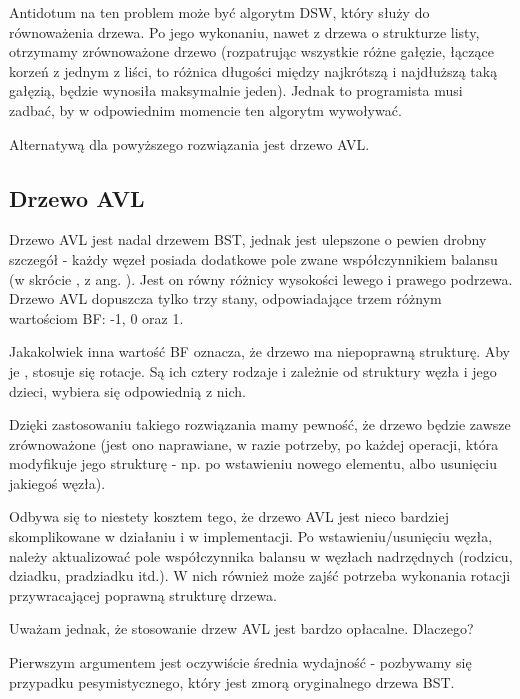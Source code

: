 \documentclass[12pt]{article}
\begin{document}
            Antidotum na ten problem może być algorytm DSW, który służy do równoważenia drzewa. Po jego wykonaniu, nawet z drzewa o strukturze listy, otrzymamy zrównoważone drzewo (rozpatrując wszystkie różne gałęzie, łączące korzeń z jednym z liści, to różnica długości między najkrótszą i najdłuższą taką gałęzią, będzie wynosiła maksymalnie jeden). Jednak to programista musi zadbać, by w odpowiednim momencie ten algorytm wywoływać.
            
            Alternatywą dla powyższego rozwiązania jest drzewo AVL.
            
        \subsection{Drzewo AVL}
            Drzewo AVL jest nadal drzewem BST, jednak jest ulepszone o pewien drobny szczegół - każdy węzeł posiada dodatkowe pole zwane współczynnikiem balansu (w skrócie , z ang. ). Jest on równy różnicy wysokości lewego i prawego podrzewa. Drzewo AVL dopuszcza tylko trzy stany, odpowiadające trzem różnym wartościom BF: -1, 0 oraz 1.
            
            Jakakolwiek inna wartość BF oznacza, że drzewo ma niepoprawną strukturę. Aby je , stosuje się rotacje. Są ich cztery rodzaje i zależnie od struktury węzła i jego dzieci, wybiera się odpowiednią z nich.
            
            Dzięki zastosowaniu takiego rozwiązania mamy pewność, że drzewo będzie zawsze zrównoważone (jest ono naprawiane, w razie potrzeby, po każdej operacji, która modyfikuje jego strukturę - np. po wstawieniu nowego elementu, albo usunięciu jakiegoś węzła).
            
            Odbywa się to niestety kosztem tego, że drzewo AVL jest nieco bardziej skomplikowane w działaniu i w implementacji. Po wstawieniu/usunięciu węzła, należy aktualizować pole współczynnika balansu w węzłach nadrzędnych (rodzicu, dziadku, pradziadku itd.). W nich również może zajść potrzeba wykonania rotacji przywracającej poprawną strukturę drzewa.
            
            Uważam jednak, że stosowanie drzew AVL jest bardzo opłacalne. Dlaczego? 
            
            Pierwszym argumentem jest oczywiście średnia wydajność - pozbywamy się przypadku pesymistycznego, który jest zmorą oryginalnego drzewa BST.
            
\end{document}
